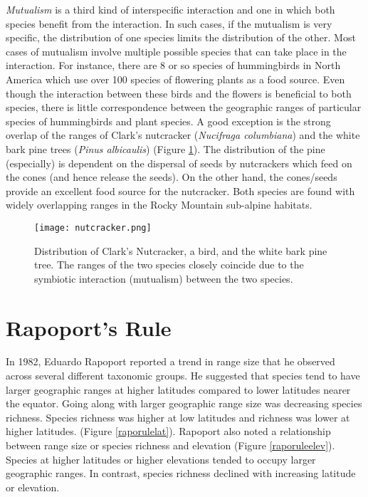 \documentclass[11pt, hidelinks]{article}
\begin{document}
\emph{Mutualism} is a third kind of interspecific interaction and one in which both species benefit from the interaction. In such cases, if the mutualism is very specific, the distribution of one species limits the distribution of the other. Most cases of mutualism involve multiple possible species that can take place in the interaction. For instance, there are 8 or so species of hummingbirds in North America which use over 100 species of flowering plants as a food source. Even though the interaction between these birds and the flowers is beneficial to both species, there is little correspondence between the geographic ranges of particular species of hummingbirds and plant species. A good exception is the strong overlap of the ranges of Clark's nutcracker (\emph{Nucifraga columbiana}) and the white bark pine trees (\emph{Pinus albicaulis}) (Figure \ref{nutcracker}). The distribution of the pine (especially) is dependent on the dispersal of seeds by nutcrackers which feed on the cones (and hence release the seeds). On the other hand, the cones/seeds provide an excellent food source for the nutcracker. Both species are found with widely overlapping ranges in the Rocky Mountain sub-alpine habitats.

\begin{figure}[tb]
	\centering
	\texttt{[image: nutcracker.png]}
	\caption{Distribution of Clark's Nutcracker, a bird, and the white bark pine tree. The ranges of the two species closely coincide due to the symbiotic interaction (mutualism) between the two species.\label{nutcracker}}
\end{figure}

\section{Rapoport's Rule}

In 1982, Eduardo Rapoport reported a trend in range size that he observed across several different taxonomic groups.  He suggested that species tend to have larger geographic ranges at higher latitudes compared to lower latitudes nearer the equator. Going along with larger geographic range size was decreasing species richness.  Species richness was higher at low latitudes and richness was lower at higher latitudes.  (Figure \ref{raporulelat}). Rapoport also noted a relationship between range size or species richness and elevation (Figure \ref{raporuleelev}).  Species at higher latitudes or higher elevations tended to occupy larger geographic ranges.  In contrast, species richness declined with increasing latitude or elevation.
\end{document}
